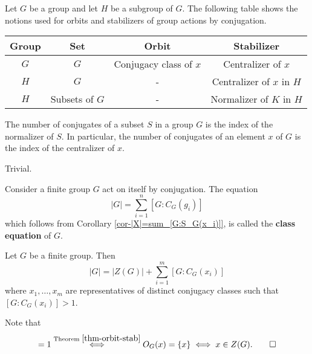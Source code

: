 \begin{remark}
\begin{definition} \label{def-notions-of-orbits-and-stab}
	Let $G$ be a group and let $H$ be a subgroup of $G$. The following table shows the notions used for orbits and stabilizers of  group actions by conjugation.
	\begin{center}
		\begin{tabular}{|c|c|c|c|}
			\hline
			Group & Set & Orbit & Stabilizer   \\
			\hline\hline
			$G$ & $G$ & Conjugacy class of $x$ & Centralizer of $x$ \\
			\hline
			$H$ & $G$ & - & Centralizer of $x$ in $H$ \\
			\hline
			$H$ & Subsets of $G$ & - & Normalizer of $K$ in $H$ \\
			\hline
		\end{tabular}
	\end{center}
\end{definition}
\begin{proposition}
	The number of conjugates of a subset $S$ in a group $G$ is the index of the
	normalizer of $S$. In particular, the number of conjugates of an element $x$
	of $G$ is the index of the centralizer of  $x$.
\end{proposition}
\begin{sketch}
	Trivial.
\end{sketch}
\begin{definition}
	Consider a finite group $G$ act on itself by conjugation. The equation
	\begin{equation*}
		|G| = \sum_{i=1}^n [G:C_G(g_i)]
	\end{equation*}
	which follows from Corollary \ref{cor-|X|=sum_[G:S_G(x_i)]}, is called the \textbf{class equation} of $G$.
\end{definition}
\begin{proposition}
	Let $G$ be a finite group. Then 
	\begin{equation*}
		|G| = |Z(G)| + \sum_{i=1}^m [G:C_G(x_i)]
	\end{equation*}
	where $x_1,\dots, x_m$ are representatives of distinct conjugacy classes such that $[G:C_G(x_i)]>1$.
\end{proposition}
\begin{sketch}
	Note that 
	\begin{equation*}
		[G:C_G(x)]=1\overset{\text{Theorem } \ref{thm-orbit-stab}}{\iff} O_G(x) = \{x\} \iff x\in Z(G). \qedhere
	\end{equation*}
\end{sketch}

\end{remark}
